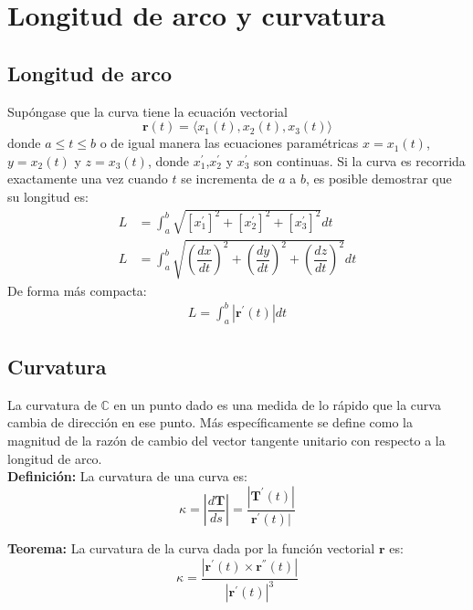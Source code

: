 \documentclass[../main]{subfiles}
\begin{document}
\chapter{Longitud de arco y curvatura}
\section{Longitud de arco}
Supóngase que la curva tiene la ecuación vectorial 
$$\mathbf{r}(t)=\langle x_1(t),x_2(t),x_3(t) \rangle$$
donde $a\leq t \leq b$ o de igual manera las ecuaciones paramétricas $x=x_1(t)$, $y=x_2(t)$ y $z=x_3(t)$, donde $x_1^{\prime}$,$x_2^{\prime}$ y $x_3^{\prime}$ son continuas. Si la curva es recorrida exactamente una vez cuando $t$ se incrementa de $a$ a $b$, es posible demostrar que su longitud es:
\begin{align}
    L&=\int_a^b \sqrt{[x_1^{\prime}]^2+[x_2^{\prime}]^2+[x_3^{\prime}]^2} dt \\
   L&=\int_a^b \sqrt{\left(\dfrac{dx}{dt} \right)^2+\left(\dfrac{dy}{dt} \right)^2+\left(\dfrac{dz}{dt} \right)^2} dt
\end{align}
De forma más compacta:
\begin{align}
    L=\int_a^b |\mathbf{r}^{\prime}(t)|dt
\end{align}
\section{Curvatura}
La curvatura de $\mathbb{C}$ en un punto dado es una medida de lo rápido que la curva cambia de dirección en ese punto. Más específicamente se define como la magnitud de la razón de cambio del vector tangente unitario con respecto a la longitud de arco.\\[0.2cm]
\textbf{Definición:} La curvatura de una curva es: 
\begin{equation}
    \kappa=\left | \dfrac{d\mathbf{T}}{ds} \right |=\dfrac{|\mathbf{T}^{\prime}(t)|}{\mathbf{r}^{\prime}(t)|}
\end{equation}

\textbf{Teorema:} La curvatura de la curva dada por la función vectorial $\mathbf{r}$ es: 
\begin{equation}
    \kappa=\dfrac{|\mathbf{r}^{\prime}(t)\times \mathbf{r}^{''}(t)|}{|\mathbf{r}^{'}(t)|^3}
\end{equation}
\end{document}
